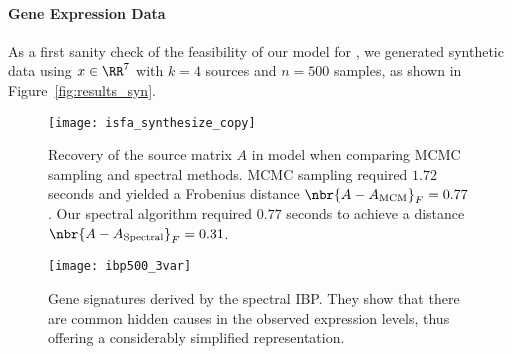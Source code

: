 \documentclass[twoside,11pt]{article}
\begin{document}
{\paragraph{Gene Expression Data}

As a first sanity check of the feasibility of our model for
, we generated synthetic data using $x \in \RR^7$ with
$k=4$ sources and $n=500$ samples, as shown in
Figure~\ref{fig:results_syn}.

\begin{figure}[tbh]
  \vspace{-1mm}
 \begin{center}
    \texttt{[image: isfa\_synthesize\_copy]}    
    \end{center}
  \hfill
    \vspace{-10mm}
    \caption{Recovery of the source matrix $A$ in model 
      when comparing MCMC sampling and spectral methods. MCMC sampling
      required $1.72$ seconds and yielded a Frobenius distance $\nbr{A
        - A_{\mathrm{MCM}}}_F = 0.77$. Our spectral
      algorithm required $0.77$ seconds to achieve a distance $\nbr{A
        - A_{\mathrm{Spectral}}}_F = 0.31$.
      \label{fig:results_syn}
    }

  \vspace{-2mm}
 \begin{center}
    \texttt{[image: ibp500\_3var]}
    \end{center}
    \vspace{-10mm}
  \hfill
    \caption{Gene signatures derived by the spectral IBP. They show that
  there are common hidden causes in the observed expression levels,
  thus offering a considerably simplified representation.
  \label{fig:ibp500}}
  \vspace{-5mm}
\end{figure} 

}
\end{document}
